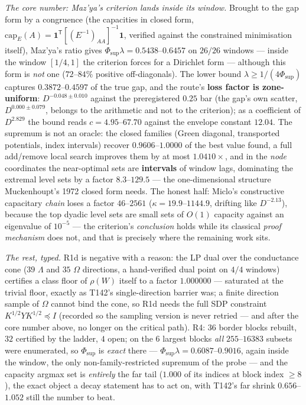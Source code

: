 \documentclass[11pt,a4paper]{article}
\begin{document}
\emph{The core number: Maz'ya's criterion lands inside its window.} Brought to the gap form by a
congruence (the capacities in closed form,
$\mathrm{cap}_E(A)=\mathbf 1^{\mathsf T}[(E^{-1})_{AA}]^{-1}\mathbf 1$, verified against the
constrained minimisation itself), Maz'ya's ratio gives
$\Phi_{\sup}\lambda=0.5438$--$0.6457$ on $26/26$ windows --- inside the window $[1/4,1]$ the
criterion forces for a Dirichlet form --- although this form is \emph{not} one ($72$--$84\%$
positive off-diagonals). The lower bound $\lambda\ge1/(4\Phi_{\sup})$ captures
$0.3872$--$0.4597$ of the true gap, and the route's \textbf{loss factor is zone-uniform}:
$D^{-0.048\pm0.010}$ against the preregistered $0.25$ bar (the gap's own scatter,
$D^{0.000\pm0.079}$, belongs to the arithmetic and not to the criterion); as a coefficient of
$D^{2.829}$ the bound reads $c=4.95$--$67.70$ against the envelope constant $12.04$. The
supremum is not an oracle: the closed families (Green diagonal, transported potentials, index
intervals) recover $0.9606$--$1.0000$ of the best value found, a full add/remove local search
improves them by at most $1.0410\times$, and in the \emph{node} coordinates the near-optimal
sets are \textbf{intervals} of window lags, dominating the extremal level sets by a factor
$8.3$--$129.5$ --- the one-dimensional structure Muckenhoupt's 1972 closed form needs. The
honest half: Miclo's constructive capacitary \emph{chain} loses a factor $46$--$2561$
($\kappa=19.9$--$1144.9$, drifting like $D^{-2.13}$), because the top dyadic level sets are
small sets of $O(1)$ capacity against an eigenvalue of $10^{-5}$ --- the criterion's
\emph{conclusion} holds while its classical \emph{proof mechanism} does not, and that is
precisely where the remaining work sits.

\emph{The rest, typed.} R1d is negative with a reason: the LP dual over the conductance cone
($39$ $\Lambda$ and $35$ $\Omega$ directions, a hand-verified dual point on $4/4$ windows)
certifies a class floor of $\rho(W)$ itself to a factor $1.000000$ --- saturated at the trivial
floor, exactly as T142's single-direction barrier was; a finite direction sample of $\Omega$
cannot bind the cone, so R1d needs the full SDP constraint
$K^{1/2}YK^{1/2}\preceq I$ (recorded so the sampling version is never retried --- and after the
core number above, no longer on the critical path). R4: $36$ border blocks rebuilt, $32$
certified by the ladder, $4$ open; on the $6$ largest blocks \emph{all} $255$--$16383$ subsets
were enumerated, so $\Phi_{\sup}$ is \emph{exact} there ---
$\Phi_{\sup}\lambda=0.6087$--$0.9016$, again inside the window, the only
non-family-restricted supremum of the probe --- and the capacity argmax set is \emph{entirely}
the far tail ($1.000$ of its indices at block index $\ge8$), the exact object a decay statement
has to act on, with T142's far shrink $0.656$--$1.052$ still the number to beat.
\end{document}

